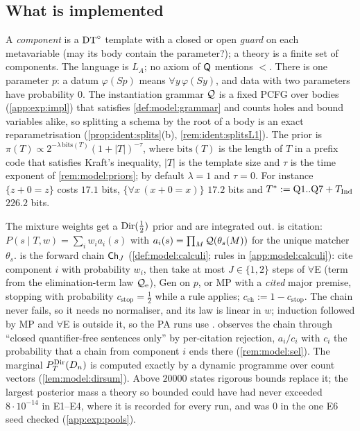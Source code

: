 \subsection{What is implemented}\label{sec:exp:impl}

A \emph{component} is a $\mathrm{DT}^{\circ}$ template with a closed or open \emph{guard} on each metavariable (may its body contain the parameter?); a theory is a finite set of components. The language is $L_A$; no axiom of $\mathsf{Q}$ mentions $<$. There is one parameter $p$: a datum $\varphi(Sp)$ means $\forall y\,\varphi(Sy)$, and data with two parameters have probability $0$. The instantiation grammar $\mathcal{Q}$ is a fixed PCFG over bodies (\cref{app:exp:impl}) that satisfies \cref{def:model:grammar} and counts holes and bound variables alike, so splitting a schema by the root of a body is an exact reparametrisation (\cref{prop:ident:splits}(b), \cref{rem:ident:splitsL1}). The prior is $\pi(T)\propto2^{-\lambda\,\mathrm{bits}(T)}(1+|T|)^{-\tau}$, where $\mathrm{bits}(T)$ is the length of $T$ in a prefix code that satisfies Kraft's inequality, $|T|$ is the template size and $\tau$ is the time exponent of \cref{rem:model:priors}; by default $\lambda=1$ and $\tau=0$. For instance $\{z+0=z\}$ costs $17.1$ bits, $\{\forall x\,(x+0=x)\}$ $17.2$ bits and $T^*:=\mathrm{Q1..Q7}+T_{\mathrm{Ind}}$ $226.2$ bits.

The mixture weights get a $\mathrm{Dir}(\tfrac12)$ prior and are integrated out. \Lzero{} is citation: $P(s\mid T,w)=\sum_iw_ia_i(s)$ with $a_i(s)=\prod_M\mathcal{Q}(\theta_s(M))$ for the unique matcher $\theta_s$. \Lone{} is the forward chain $\mathsf{Ch}_{J}$ (\cref{def:model:calculi}; rules in \cref{app:model:calculi}): cite component $i$ with probability $w_i$, then take at most $J\in\{1,2\}$ steps of $\forall$E (term from the elimination-term law $\mathcal{Q}_{\mathrm{e}}$), Gen on $p$, or MP with a \emph{cited} major premise, stopping with probability $c_{\mathrm{stop}}=\tfrac12$ while a rule applies; $c_{\mathrm{ch}}:=1-c_{\mathrm{stop}}$. The chain never fails, so it needs no normaliser, and its law is linear in $w$; induction followed by MP and $\forall$E is outside it, so the PA runs use \Lzero. \Lselc{} observes the chain through ``closed quantifier-free sentences only'' by per-citation rejection, $a_i/c_i$ with $c_i$ the probability that a chain from component $i$ ends there (\cref{rem:model:sel}). The marginal $P^{\mathrm{Dir}}_{T}(D_n)$ is computed exactly by a dynamic programme over count vectors (\cref{lem:model:dirsum}). Above $20000$ states rigorous bounds replace it; the largest posterior mass a theory so bounded could have had never exceeded $8\cdot10^{-14}$ in E1--E4, where it is recorded for every run, and was $0$ in the one E6 seed checked (\cref{app:exp:pools}).

